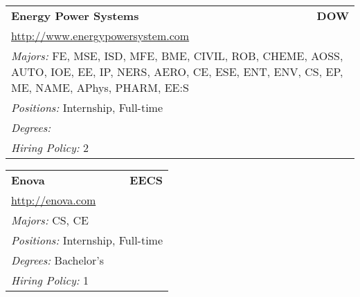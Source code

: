\documentclass[twoside]{article}
\begin{document}
\begin{center}
\begin{multicols}{3}
\begin{FlushLeft}
\begin{minipage}{\columnwidth}
\end{minipage}
 
\begin{minipage}{\columnwidth}\begin{tabularx}{.95\columnwidth}{Xr}
                 {\Large\bf Energy Power Systems} & {\Large\bf DOW}\\
    \multicolumn{2}{p{.95\columnwidth}}{\url{http://www.energypowersystem.com}}\\
    \multicolumn{2}{p{.95\columnwidth}}{\emph{Majors:} FE, MSE, ISD, MFE, BME, CIVIL, ROB, CHEME, AOSS, AUTO, IOE, EE, IP, NERS, AERO, CE, ESE, ENT, ENV, CS, EP, ME, NAME, APhys, PHARM, EE:S}\\
    \multicolumn{2}{p{.95\columnwidth}}{\emph{Positions:} Internship, Full-time}\\
    \multicolumn{2}{p{.95\columnwidth}}{\emph{Degrees:} }\\
    \multicolumn{2}{p{.95\columnwidth}}{\emph{Hiring Policy:} 2}\\
    \end{tabularx}
    
\end{minipage}
 
\begin{minipage}{\columnwidth}\begin{tabularx}{.95\columnwidth}{Xr}
                 {\Large\bf Enova} & {\Large\bf EECS}\\
    \multicolumn{2}{p{.95\columnwidth}}{\url{http://enova.com}}\\
    \multicolumn{2}{p{.95\columnwidth}}{\emph{Majors:} CS, CE}\\
    \multicolumn{2}{p{.95\columnwidth}}{\emph{Positions:} Internship, Full-time}\\
    \multicolumn{2}{p{.95\columnwidth}}{\emph{Degrees:} Bachelor's}\\
    \multicolumn{2}{p{.95\columnwidth}}{\emph{Hiring Policy:} 1}\\
    \end{tabularx}
    
\end{minipage}
 

\end{FlushLeft}
\end{multicols}
\end{center}
\end{document}
